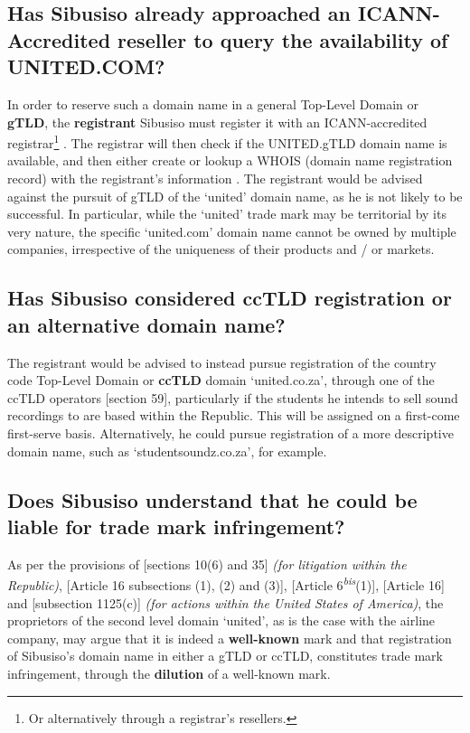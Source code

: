 \documentclass[11pt]{article}
\begin{document}
\subsection{Has Sibusiso already approached an ICANN-Accredited reseller to query the availability of UNITED.COM?}
\label{sec:orgfe28459}
In order to reserve such a domain name in a general Top-Level Domain or \textbf{gTLD},
the \textbf{registrant} Sibusiso must register it with an ICANN-accredited
registrar\footnote{Or alternatively through a registrar's resellers.}
\cite{icann13_rules}. The registrar will then check if the UNITED.gTLD domain name
is available, and then either create or lookup a WHOIS (domain name registration
record) with the registrant's information \cite{icann99_policy}. The registrant would be advised
against the pursuit of gTLD of the `united' domain name, as he is not likely to
be successful. In particular, while the `united' trade mark may be territorial by
its very nature, the specific `united.com' domain name cannot be owned by
multiple companies, irrespective of the uniqueness of their products and / or
markets.\\

\subsection{Has Sibusiso considered ccTLD registration or an alternative domain name?}
\label{sec:orgd8109ad}
The registrant would be advised to instead pursue registration of the country
code Top-Level Domain or \textbf{ccTLD} domain `united.co.za', through one of the ccTLD
operators [section 59]\cite{rsa02_elect_comm_trans_act}, particularly if the
students he intends to sell sound recordings to are based within the Republic.
This will be assigned on a first-come first-serve basis. Alternatively, he could
pursue registration of a more descriptive domain name, such as
`studentsoundz.co.za', for example.

\subsection{Does Sibusiso understand that he could be liable for trade mark infringement?}
\label{sec:orgc445640}
As per the provisions of [sections 10(6) and 35]\cite{rsa93_tm_act} \emph{(for
litigation within the Republic)}, [Article 16 subsections (1), (2) and
(3)]\cite{wto17_trips}, [Article
6\textsuperscript{\textit{bis}}(1)]\cite{wipo83_paris_conve_protect_ip},
[Article 16]\cite{wipo70_tlt} and [subsection 1125(c)]\cite{usa46_title15_ch22}
\emph{(for actions within the United States of America)}, the proprietors of the
second level domain `united', as is the case with the airline company, may argue
that it is indeed a \textbf{well-known} mark and that registration of Sibusiso's domain
name in either a gTLD or ccTLD, constitutes trade mark infringement, through the
\textbf{dilution} of a well-known mark.
\end{document}
